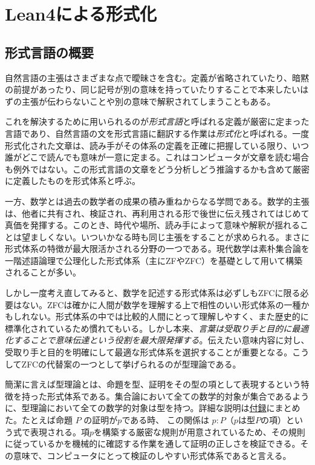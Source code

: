\documentclass[a4paper,12pt]{bxjsbook}
\newlength{\customindent}
\newenvironment{body}{
  \par
  \begingroup
  \setlength{\leftskip}{\customindent}
  \setlength{\rightskip}{0pt}
  \setlength{\parindent}{1em}
  \setlength{\displayindent}{\customindent}
  \setlength{\displaywidth}{\dimexpr\linewidth-\customindent\relax}
}{
  \par
  \endgroup
}
\theoremstyle{theorem}
\begin{document}
    \chapter{Lean4による形式化}
    \section{形式言語の概要}
    \begin{body}
        \indent 自然言語の主張はさまざまな点で曖昧さを含む。定義が省略されていたり、暗黙の前提があったり、同じ記号が別の意味を持っていたりすることで本来したいはずの主張が伝わらないことや別の意味で解釈されてしまうこともある。

        \indent これを解決するために用いられるのが\emph{形式言語}と呼ばれる定義が厳密に定まった言語であり、自然言語の文を形式言語に翻訳する作業は\emph{形式化}と呼ばれる。一度形式化された文章は、読み手がその体系の定義を正確に把握している限り、いつ誰がどこで読んでも意味が一意に定まる。これはコンピュータが文章を読む場合も例外ではない。この形式言語の文章をどう分析しどう推論するかも含めて厳密に定義したものを形式体系と呼ぶ。

        \indent 一方、数学とは過去の数学者の成果の積み重ねからなる学問である。数学的主張は、他者に共有され、検証され、再利用される形で後世に伝え残されてはじめて真価を発揮する。このとき、時代や場所、読み手によって意味や解釈が揺れることは望ましくない。いついかなる時も同じ主張をすることが求められる。まさに形式体系の特徴が最大限活かされる分野の一つである。現代数学は素朴集合論を一階述語論理で公理化した形式体系（主にZFやZFC）を基礎として用いて構築されることが多い。

        \indent しかし一度考え直してみると、数学を記述する形式体系は必ずしもZFCに限る必要はない。ZFCは確かに人間が数学を理解する上で相性のいい形式体系の一種かもしれない。形式体系の中では比較的人間にとって理解しやすく、また歴史的に標準化されているため慣れてもいる。しかし本来、\emph{言葉は受取り手と目的に最適化することで意味伝達という役割を最大限発揮する}。伝えたい意味内容に対し、受取り手と目的を明確にして最適な形式体系を選択することが重要となる。こうしてZFCの代替案の一つとして挙げられるのが型理論である。

        \indent 簡潔に言えば型理論とは、命題を型、証明をその型の項として表現するという特徴を持った形式体系である。集合論において全ての数学的対象が集合であるように、型理論において全ての数学的対象は型を持つ。詳細な説明は\hyperref[appendix:type-theory]{付録}にまとめた。たとえば命題 $P$ の証明が$p$である時、 この関係は $p:P$（$p$は型$P$の項）という式で表現される。項$p$を構築する厳密な規則が用意されているため、その規則に従っているかを機械的に確認する作業を通して証明の正しさを検証できる。その意味で、コンピュータにとって検証のしやすい形式体系であると言える。

    \end{body}
\end{document}
